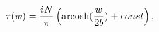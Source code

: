 \begin{equation}
\tau(w)={iN\over \pi}\left ( {\rm arcosh}({w\over 2b}) 
+ {\mbox const}\right),
\label{tau}
\end{equation}

